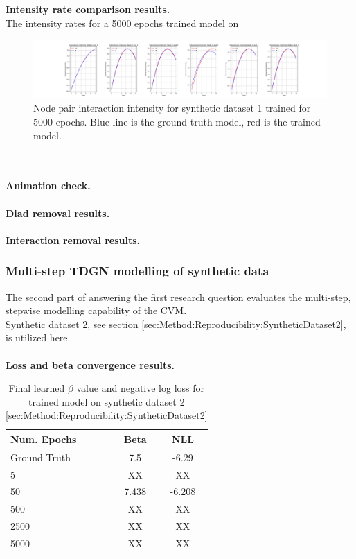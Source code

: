 \\\\
\textbf{Intensity rate comparison results.}
\\
The intensity rates for a 5000 epochs trained model on 

\begin{figure}[H]
    \centering
    \includegraphics[width=\textwidth]{0_images/synth1_epochs5000.png}
    \caption{Node pair interaction intensity for synthetic dataset 1 trained for 5000 epochs. Blue line is the ground truth model, red is the trained model.}
    \label{fig:RQ1synth1}
\end{figure}
\\\\
\textbf{Animation check.}
\\\\
\textbf{Diad removal results.}
\\\\
\textbf{Interaction removal results.}




\subsubsection{Multi-step TDGN modelling of synthetic data}
\label{sec:ResearchQuestion1:multiStepSynthetic}
The second part of answering the first research question evaluates the multi-step, stepwise modelling capability of the CVM.
\\
Synthetic dataset 2, see section \ref{sec:Method:Reproducibility:SyntheticDataset2}, is utilized here.
\\\\
\textbf{Loss and beta convergence results.}

\begin{table}[H]
\centering
\begin{tabular}{|l|cc|}
\hline
Num. Epochs   & Beta & NLL\\ \hline
Ground Truth & 7.5  & -6.29      \\
5          & XX   & XX       \\
50          & 7.438   & -6.208       \\
500          & XX   & XX       \\
2500          & XX   & XX       \\
5000          & XX   & XX       \\
\hline
\end{tabular}
\caption{Final learned $\beta$ value and negative log loss for trained model on synthetic dataset 2 \ref{sec:Method:Reproducibility:SyntheticDataset2}}
\label{tab:MultiStep1}
\end{table}

